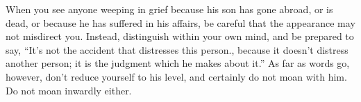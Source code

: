 When you  see anyone weeping in  grief because his  son has gone abroad,  or is
dead, or because he has suffered in his affairs, be careful that the appearance
may  not misdirect  you.  Instead, distinguish  within your  own  mind, and  be
prepared to say, ``It's not the  accident that distresses this person., because
it doesn't  distress another person;  it is the  judgment which he  makes about
it.'' As  far as  words go, however,  don't reduce yourself  to his  level, and
certainly do not moan with him. Do not moan inwardly either.

